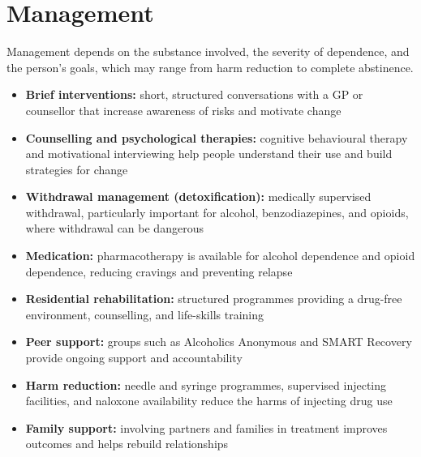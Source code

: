 \section*{Management}
Management depends on the substance involved, the severity of dependence, and the person's goals, which may range from harm reduction to complete abstinence.
\begin{itemize}
    \item \textbf{Brief interventions:} short, structured conversations with a GP or counsellor that increase awareness of risks and motivate change
    \item \textbf{Counselling and psychological therapies:} cognitive behavioural therapy and motivational interviewing help people understand their use and build strategies for change
    \item \textbf{Withdrawal management (detoxification):} medically supervised withdrawal, particularly important for alcohol, benzodiazepines, and opioids, where withdrawal can be dangerous
    \item \textbf{Medication:} pharmacotherapy is available for alcohol dependence and opioid dependence, reducing cravings and preventing relapse
    \item \textbf{Residential rehabilitation:} structured programmes providing a drug-free environment, counselling, and life-skills training
    \item \textbf{Peer support:} groups such as Alcoholics Anonymous and SMART Recovery provide ongoing support and accountability
    \item \textbf{Harm reduction:} needle and syringe programmes, supervised injecting facilities, and naloxone availability reduce the harms of injecting drug use
    \item \textbf{Family support:} involving partners and families in treatment improves outcomes and helps rebuild relationships
\end{itemize}

